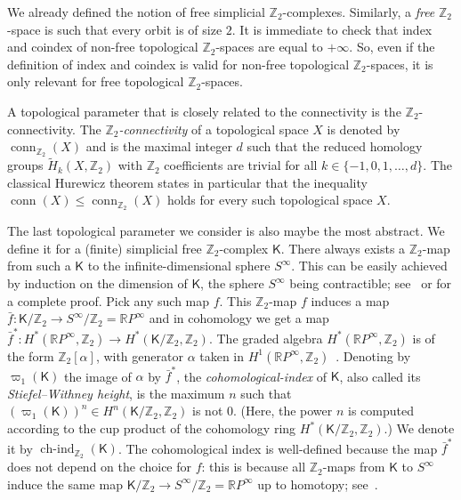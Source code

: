 \documentclass[12pt]{amsart}
\theoremstyle{definition}
\def\R{\mathbb{R}}
\def\Z{\mathbb{Z}}
\def\K{\mathsf{K}}
\renewcommand{\leq}{\leqslant}
\def\conn{\operatorname{conn}}
\def\hind{\operatorname{ch-ind}_{\Z_2}}
\begin{document}
We already defined the notion of free simplicial $\Z_2$-complexes. Similarly, a {\em free} $\Z_2$-space is such that every orbit is of size $2$. It is immediate to check that index and coindex of non-free topological $\Z_2$-spaces are equal to $+\infty$. So, even if the definition of index and coindex is valid for non-free topological $\Z_2$-spaces, it is only relevant for free topological $\Z_2$-spaces.


A topological parameter that is closely related to the connectivity is the $\Z_2$-connectivity. The \emph{$\Z_2$-connectivity} of a topological space $X$ is denoted by $\conn_{\Z_2}(X)$ and is the maximal integer $d$ such that the reduced homology groups $\widetilde H_k(X,\Z_2)$ with $\Z_2$ coefficients are trivial for all $k \in\{-1,0,1,\ldots,d\}$. The classical Hurewicz theorem states in particular that the inequality $\conn(X)\leq\conn_{\Z_2}(X)$ holds for every such topological space $X$.

The last topological parameter we consider is also maybe the most abstract. We define it for a (finite) simplicial free $\Z_2$-complex $\K$. There always exists a $\Z_2$-map from such a $\K$ to the infinite-dimensional sphere $S^{\infty}$. This can be easily achieved by induction on the dimension of $\K$, the sphere $S^{\infty}$ being contractible; see~\cite[Proposition 5.3.2(v)]{matousek2008using} or \cite[Proposition 8.16]{kozlov2008combinatorial} for a complete proof. Pick any such map $f$. This $\Z_2$-map $f$ induces a map $\bar f \colon \K / \Z_2 \rightarrow S^{\infty} / \Z_2 = \R P^{\infty}$ and in cohomology we get a map $\bar f^* \colon H^*(\R P^{\infty},\Z_2) \rightarrow H^*(\K/\Z_2,\Z_2)$. The graded algebra $H^*(\R P^{\infty},\Z_2)$ is of the form $\Z_2[\alpha]$, with generator $\alpha$ taken in $H^1(\R P^{\infty},\Z_2)$~\cite[Theorem 3.19]{hatcher2005algebraic}. Denoting by $\varpi_1(\K)$ the image of $\alpha$ by $\bar f^*$, the {\em cohomological-index} of $\K$, also called its \emph{Stiefel--Withney height}, is the maximum $n$ such that $(\varpi_1(\K))^n \in H^n(\K/\Z_2,\Z_2)$ is not $0$. (Here, the power $n$ is computed according to the cup product of the cohomology ring $H^*(\K/\Z_2,\Z_2)$.) We denote it by $\hind(\K)$. The cohomological index is well-defined because the map $\bar f^*$ does not depend on the choice for $f$: this is because all $\Z_2$-maps from $\K$ to $S^{\infty}$ induce the same map $\K / \Z_2 \rightarrow S^{\infty} / \Z_2 = \R P^{\infty}$ up to homotopy; see~\cite[Theorem 8.17]{kozlov2008combinatorial}.
\end{document}
